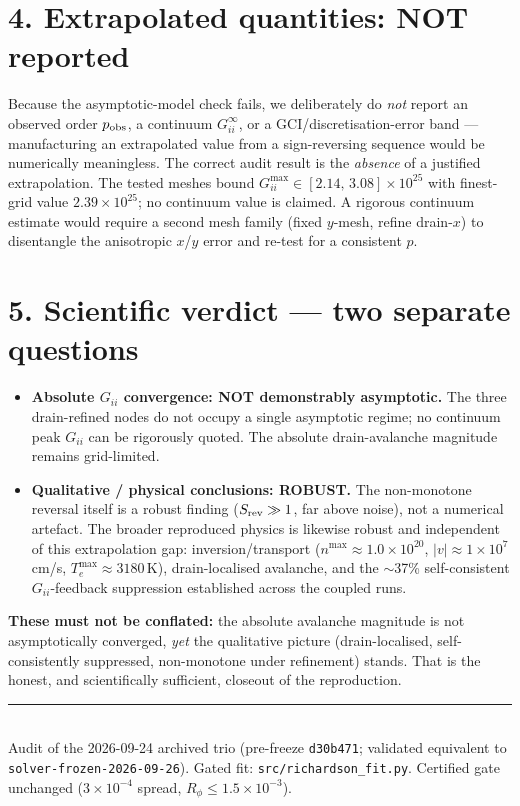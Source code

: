 \documentclass[11pt]{article}
\newcommand{\ten}[1]{\times 10^{#1}}
\newcommand{\Gii}{G_{ii}}
\begin{document}
\section*{4. Extrapolated quantities: NOT reported}
Because the asymptotic-model check fails, we deliberately do \emph{not} report an observed order
$p_{\rm obs}$, a continuum $\Gii^{\infty}$, or a GCI/discretisation-error band --- manufacturing an
extrapolated value from a sign-reversing sequence would be numerically meaningless. The correct
audit result is the \emph{absence} of a justified extrapolation. The tested meshes bound
$\Gii^{\max}\in[2.14,\,3.08]\ten{25}$ with finest-grid value $2.39\ten{25}$; no continuum value is
claimed. A rigorous continuum estimate would require a second mesh family (fixed $y$-mesh, refine
drain-$x$) to disentangle the anisotropic $x$/$y$ error and re-test for a consistent $p$.

\section*{5. Scientific verdict --- two separate questions}
\begin{itemize}[leftmargin=1.5em]
\item[\textbf{(a)}] \textbf{Absolute $\Gii$ convergence: NOT demonstrably asymptotic.} The three
drain-refined nodes do not occupy a single asymptotic regime; no continuum peak $\Gii$ can be
rigorously quoted. The absolute drain-avalanche magnitude remains grid-limited.
\item[\textbf{(b)}] \textbf{Qualitative / physical conclusions: ROBUST.} The non-monotone reversal
itself is a robust finding ($S_{\rm rev}\gg1$, far above noise), not a numerical artefact. The
broader reproduced physics is likewise robust and independent of this extrapolation gap:
inversion/transport ($n^{\max}\!\approx\!1.0\ten{20}$, $|v|\!\approx\!1\ten{7}$\,cm/s,
$T_e^{\max}\!\approx\!3180$\,K), drain-localised avalanche, and the $\sim$37\% self-consistent
$\Gii$-feedback suppression established across the coupled runs.
\end{itemize}
\textbf{These must not be conflated:} the absolute avalanche magnitude is not asymptotically
converged, \emph{yet} the qualitative picture (drain-localised, self-consistently suppressed,
non-monotone under refinement) stands. That is the honest, and scientifically sufficient, closeout
of the reproduction.

\vfill
\noindent\rule{\linewidth}{0.4pt}\\
{\footnotesize Audit of the 2026-09-24 archived trio (pre-freeze \texttt{d30b471}; validated
equivalent to \texttt{solver-frozen-2026-09-26}). Gated fit:
\texttt{src/richardson\_fit.py}. Certified gate unchanged ($3\ten{-4}$ spread, $R_\phi\le1.5\ten{-3}$).}
\end{document}
